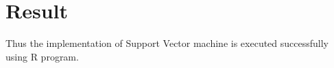 \documentclass[a4paper,10pt]{article}
\begin{document}

\section{Result}
Thus the implementation of Support Vector machine is executed successfully using R program.
\end{document}
